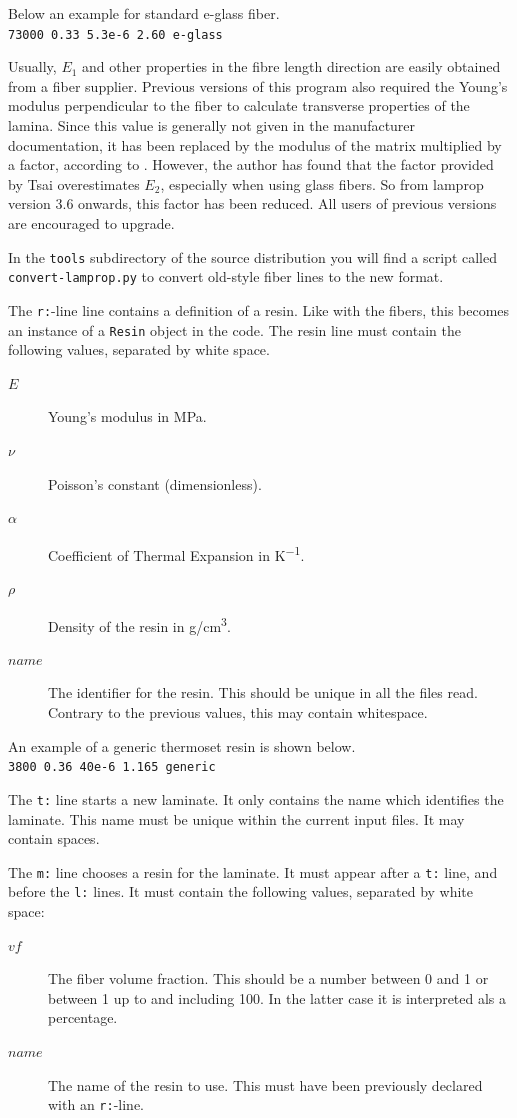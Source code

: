 \documentclass[a4paper,landscape,oneside,11pt,twocolumn]{memoir}
\begin{document}
Below an example for standard e-glass fiber.\\
\texttt{73000 0.33 5.3e-6 2.60 e-glass}

Usually, $E_1$ and other properties in the fibre length direction are easily
obtained from a fiber supplier. Previous versions of this program also
required the Young's modulus perpendicular to the fiber to calculate
transverse properties of the lamina. Since this value is generally not given
in the manufacturer documentation, it has been replaced by the modulus of the
matrix multiplied by a factor, according to \citet{Tsai:1992}. However, the
author has found that the factor provided by Tsai overestimates $E_2$,
especially when using glass fibers. So from lamprop version 3.6 onwards, this
factor has been reduced. All users of previous versions are encouraged to
upgrade.

In the \texttt{tools} subdirectory of the source distribution you will find
a script called \texttt{convert-lamprop.py} to convert old-style fiber lines
to the new format.

The \texttt{r:}-line line contains a definition of a resin. Like with the
fibers, this becomes an instance of a \texttt{Resin} object in the code. The
resin line must contain the following values, separated by white space.
\begin{description}
    \item[$E$] Young's modulus in \si{MPa}.
    \item[$\nu$] Poisson's constant (dimensionless).
    \item[$\alpha$] Coefficient of Thermal Expansion in \si{K^{-1}}.
    \item[$\rho$] Density of the resin in \si{g/cm^3}.
    \item[$name$] The identifier for the resin. This should be unique in all
        the files read. Contrary to the previous values, this may contain
        whitespace.
\end{description}

An example of a generic thermoset resin is shown below.\\
\texttt{3800 0.36 40e-6 1.165 generic}

The \texttt{t:} line starts a new laminate. It only contains the name which
identifies the laminate. This name must be unique within the current input
files. It may contain spaces.

The \texttt{m:} line chooses a resin for the laminate. It must appear after
a \texttt{t:} line, and before the \texttt{l:} lines. It must contain the
following values, separated by white space:
\begin{description}
    \item[$vf$] The fiber volume fraction. This should be a number between
        0 and 1 or between 1 up to and including 100. In the latter case it
        is interpreted als a percentage.
    \item[$name$] The name of the resin to use. This must have been previously
        declared with an \texttt{r:}-line.
\end{description}
\end{document}
